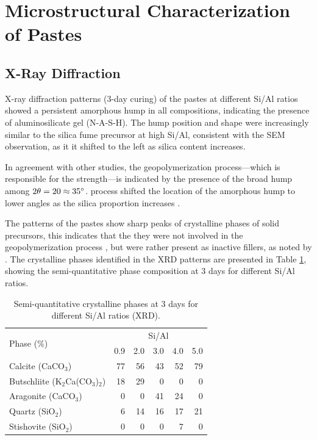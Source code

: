 \section{Microstructural Characterization of Pastes}

\subsection{X-Ray Diffraction}

X-ray diffraction patterns (3-day curing) of the pastes at different Si/Al ratios showed a persistent amorphous hump in all compositions, indicating the presence of aluminosilicate gel (N-A-S-H).
The hump position and shape were increasingly similar to the silica fume precursor at high Si/Al, consistent with the SEM observation, as it it shifted to the left as silica content increases. 

In agreement with other studies, the geopolymerization process—which is responsible for the strength—is indicated by the presence of the broad hump among $2\theta = 20 \approx 35^{\circ}$.
process shifted the location of the amorphous hump to lower angles as the silica proportion increases \cite{arellano2014geopolymer,lee2017strength, wan2017geopolymerization}.

The patterns of the pastes show sharp peaks of crystalline phases of solid precursors, this indicates that the they were not involved in the geopolymerization process \cite{Geraldo2020}, but were rather present as inactive fillers, as noted by \cite{ruiz2012alkaline}.
The crystalline phases identified in the XRD patterns are presented in Table \ref{tab:xrd_phases_pastes}, showing the semi-quantitative phase composition at 3 days for different Si/Al ratios.

\begin{table}[H]
    \centering
    \caption{Semi-quantitative crystalline phases at 3 days for different Si/Al ratios (XRD).}
    \label{tab:xrd_phases_pastes}
    \begin{tabular}{lrrrrr}
        \hline
        \multirow{2}{*}{Phase (\%)} &
        \multicolumn{5}{c}{Si/Al}\\
        \cline{2-6}
        & 0.9 & 2.0 & 3.0 & 4.0 & 5.0 \\
        \hline
        Calcite (CaCO$_3$) & 77 & 56 & 43 & 52 & 79 \\
        Butschliite (K$_2$Ca(CO$_3$)$_2$) & 18 & 29 & 0 & 0 & 0 \\
        Aragonite (CaCO$_3$) & 0 & 0 & 41 & 24 & 0 \\
        Quartz (SiO$_2$) & 6 & 14 & 16 & 17 & 21 \\
        Stishovite (SiO$_2$) & 0 & 0 & 0 & 7 & 0 \\
        \hline
    \end{tabular}
\end{table}

